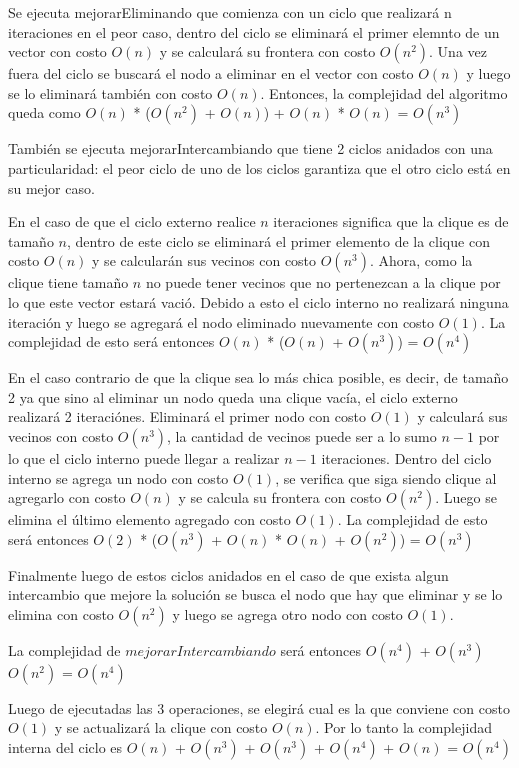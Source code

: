 Se ejecuta mejorarEliminando que comienza con un ciclo que realizará n iteraciones en el peor caso, dentro del ciclo se eliminará el primer elemnto de un vector con costo $O(n)$ y se calculará su frontera con costo $O(n^2)$. Una vez fuera del ciclo se buscará el nodo a eliminar en el vector con costo $O(n)$ y luego se lo eliminará también con costo $O(n)$. Entonces, la complejidad del algoritmo queda como $O(n)$ * ($O(n^2)$ + $O(n)$) + $O(n)$ * $O(n)$ = $O(n^3)$

También se ejecuta mejorarIntercambiando que tiene 2 ciclos anidados con una particularidad: el peor ciclo de uno de los ciclos garantiza que el otro ciclo está en su mejor caso. 

En el caso de que el ciclo externo realice $n$ iteraciones significa que la clique es de tamaño $n$, dentro de este ciclo se eliminará el primer elemento de la clique con costo $O(n)$ y se calcularán sus vecinos con costo $O(n^3)$. Ahora, como la clique tiene tamaño $n$ no puede tener vecinos que no pertenezcan a la clique por lo que este vector estará vació. Debido a esto el ciclo interno no realizará ninguna iteración y luego se agregará el nodo eliminado nuevamente con costo $O(1)$. La complejidad de esto será entonces $O(n)$ * ($O(n)$ + $O(n^3)$) = $O(n^4)$

En el caso contrario de que la clique sea lo más chica posible, es decir, de tamaño 2 ya que sino al eliminar un nodo queda una clique vacía, el ciclo externo realizará 2 iteraciónes. Eliminará el primer nodo con costo $O(1)$ y calculará sus vecinos con costo $O(n^3)$, la cantidad de vecinos puede ser a lo sumo $n-1$ por lo que el ciclo interno puede llegar a realizar $n-1$ iteraciones. Dentro del ciclo interno se agrega un nodo con costo $O(1)$, se verifica que siga siendo clique al agregarlo con costo $O(n)$ y se calcula su frontera con costo $O(n^2)$. Luego se elimina el último elemento agregado con costo $O(1)$. La complejidad de esto será entonces $O(2)$ * ($O(n^3)$ + $O(n)$ * $O(n)$ + $O(n^2)$) = $O(n^3)$

Finalmente luego de estos ciclos anidados en el caso de que exista algun intercambio que mejore la solución se busca el nodo que hay que eliminar y se lo elimina con costo $O(n^2)$ y luego se agrega otro nodo con costo $O(1)$.

La complejidad de $mejorarIntercambiando$ será entonces $O(n^4)$ + $O(n^3)$ $O(n^2)$ = $O(n^4)$

Luego de ejecutadas las 3 operaciones, se elegirá cual es la que conviene con costo $O(1)$ y se actualizará la clique con costo $O(n)$. Por lo tanto la complejidad interna del ciclo es $O(n)$ + $O(n^3)$ + $O(n^3)$ + $O(n^4)$ + $O(n)$ = $O(n^4)$


